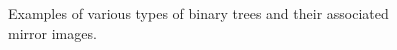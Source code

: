 \begin{figure}
\caption[]{Examples of various types of binary trees and their associated mirror images.}

\end{figure}
